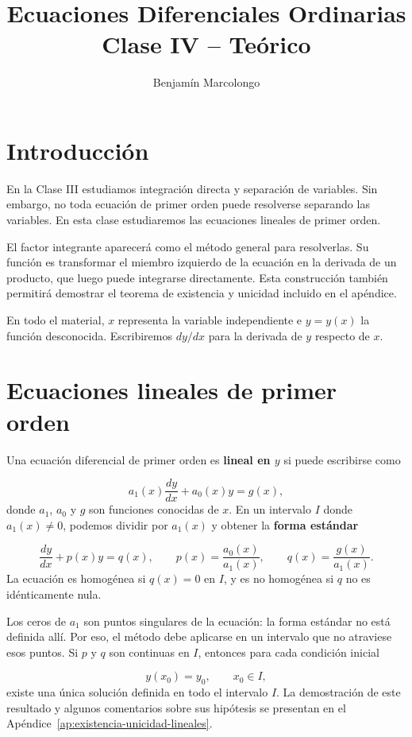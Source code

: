 \documentclass[12pt,a4paper]{article}
\title{Ecuaciones Diferenciales Ordinarias\\Clase IV -- Teórico}
\author{Benjamín Marcolongo}
\date{}
\begin{document}
	\maketitle

	\section*{Introducción}

	En la Clase III estudiamos integración directa y separación de variables. Sin embargo, no toda ecuación de primer orden puede resolverse separando las variables. En esta clase estudiaremos las ecuaciones lineales de primer orden.

	El factor integrante aparecerá como el método general para resolverlas. Su función es transformar el miembro izquierdo de la ecuación en la derivada de un producto, que luego puede integrarse directamente. Esta construcción también permitirá demostrar el teorema de existencia y unicidad incluido en el apéndice.

	En todo el material, \(x\) representa la variable independiente e \(y=y(x)\) la función desconocida. Escribiremos \(dy/dx\) para la derivada de \(y\) respecto de \(x\).

	\clearpage
	\section{Ecuaciones lineales de primer orden}

	Una ecuación diferencial de primer orden es \textbf{lineal en \(y\)} si puede escribirse como

	\[
	a_1(x)\frac{dy}{dx}+a_0(x)y=g(x),
	\]
	donde \(a_1\), \(a_0\) y \(g\) son funciones conocidas de \(x\). En un intervalo \(I\) donde \(a_1(x)\neq0\), podemos dividir por \(a_1(x)\) y obtener la \textbf{forma estándar}

	\[
	\boxed{
	\frac{dy}{dx}+p(x)y=q(x),
	}
	\qquad
	p(x)=\frac{a_0(x)}{a_1(x)},
	\qquad
	q(x)=\frac{g(x)}{a_1(x)}.
	\]
	La ecuación es homogénea si \(q(x)=0\) en \(I\), y es no homogénea si \(q\) no es idénticamente nula.

	Los ceros de \(a_1\) son puntos singulares de la ecuación: la forma estándar no está definida allí. Por eso, el método debe aplicarse en un intervalo que no atraviese esos puntos. Si \(p\) y \(q\) son continuas en \(I\), entonces para cada condición inicial

	\[
	y(x_0)=y_0,
	\qquad x_0\in I,
	\]
	existe una única solución definida en todo el intervalo \(I\). La demostración de este resultado y algunos comentarios sobre sus hipótesis se presentan en el Apéndice~\ref{ap:existencia-unicidad-lineales}.
\end{document}

